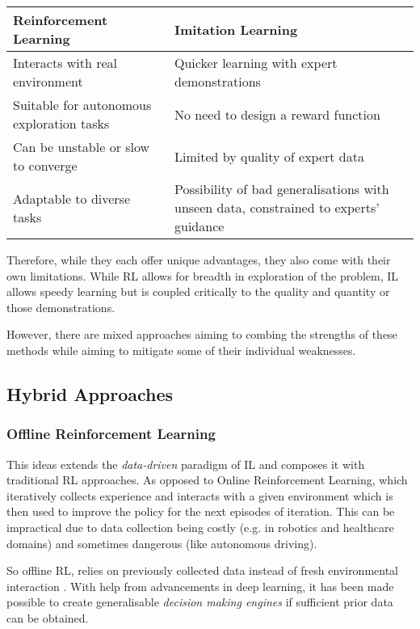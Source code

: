 \begin{table}[h!]
  \centering
    \begin{tabularx}{\textwidth}{|X|X|}
    \hline
    \textbf{Reinforcement Learning} & \textbf{Imitation Learning} \\
    \hline
    Interacts with real environment & Quicker learning with expert demonstrations \\
    Suitable for autonomous exploration tasks & No need to design a reward function \\
    Can be unstable or slow to converge & Limited by quality of expert data \\
    Adaptable to diverse tasks & Possibility of bad generalisations with unseen data, constrained to experts' guidance \\
    \hline
    \end{tabularx}
\end{table}

Therefore, while they each offer unique advantages, they also come with their own limitations. While RL allows for breadth in exploration of the problem, IL allows speedy learning but is coupled critically to the quality and quantity or those demonstrations. 

However, there are mixed approaches aiming to combing the strengths of these methods while aiming to mitigate some of their individual weaknesses.

\subsection{Hybrid Approaches}


\subsubsection{Offline Reinforcement Learning}
This ideas extends the \emph{data-driven} paradigm of IL and composes it with traditional RL approaches. As opposed to Online Reinforcement Learning, which iteratively collects experience and interacts with a given environment which is then used to improve the policy for the next episodes of iteration. This can be impractical due to data collection being costly (e.g. in robotics and healthcare domains) and sometimes dangerous (like autonomous driving). 

So offline RL, relies on previously collected data instead of fresh environmental interaction \cite{levine2020offlinereinforcementlearningtutorial}. With help from advancements in deep learning, it has been made possible to create generalisable \emph{decision making engines} \cite{levine2020offlinereinforcementlearningtutorial} if sufficient prior data can be obtained.

